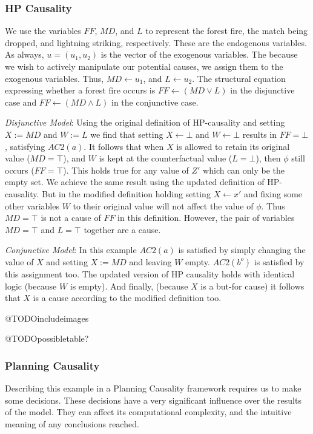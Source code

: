 \documentclass{article}
\theoremstyle{plain}
\theoremstyle{definition}
\begin{document}
\subsubsection*{HP Causality}
We use the variables $FF$, $MD$, and $L$ to represent the forest fire, the match being dropped, and lightning striking, respectively. These are the endogenous variables. As always, $u=(u_1, u_2)$ is the vector of the exogenous variables. The because we wish to actively manipulate our potential causes, we assign them to the exogenous variables. Thus, $MD \leftarrow u_1$, and $L \leftarrow u_2$. The structural equation expressing whether a forest fire occurs is $FF\leftarrow(MD \lor L)$ in the disjunctive case and $FF \leftarrow (MD \land L)$ in the conjunctive case.

\textit{Disjunctive Model}: Using the original definition of HP-causality and setting $X:=MD$ and $W:=L$ we find that setting $X \leftarrow \bot$ and $W \leftarrow \bot$ results in $FF=\bot$, satisfying $AC2(a)$. It follows that when $X$  is allowed to retain its original value ($MD=\top$), and $W$ is kept at the counterfactual value ($L=\bot$), then $\phi$ still occurs ($FF=\top$). This holds true for any value of $Z'$ which can only be the empty set. We achieve the same result using the updated definition of HP-causality. But in the modified definition holding setting $X \leftarrow x'$ and fixing some other variables $W$ to their original value will not affect the value of $\phi$. Thus $MD=\top$ is not a cause of $FF$ in this definition. However, the pair of variables $MD=\top$ and $L=\top$ together are a cause.

\textit{Conjunctive Model}: In this example $AC2(a)$ is satisfied by simply changing the value of $X$ and setting $X:=MD$ and leaving $W$ empty. $AC2(b^o)$ is satisfied by this assignment too. The updated version of HP causality holds with identical logic (because $W$ is empty). And finally, (because $X$ is a but-for cause) it follows that $X$ is a cause according to the modified definition too.

@TODOincludeimages

@TODOpossibletable?

\subsubsection*{Planning Causality}
Describing this example in a Planning Causality framework requires us to make some decisions. These decisions have a very significant influence over the results of the model. They can affect its computational complexity, and the intuitive meaning of any conclusions reached.
\end{document}
